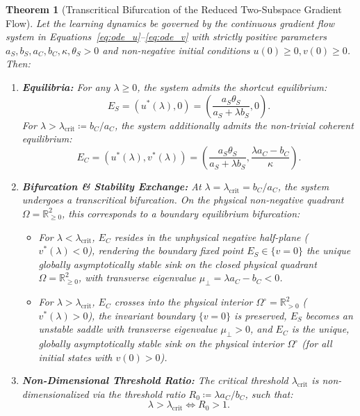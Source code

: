 \documentclass{article}
\theoremstyle{plain}
\newtheorem{theorem}{Theorem}
\theoremstyle{definition}
\begin{document}
\begin{theorem}[Transcritical Bifurcation of the Reduced Two-Subspace Gradient Flow]
\label{thm:transcritical_bifurcation}
Let the learning dynamics be governed by the continuous gradient flow system in Equations~\eqref{eq:ode_u}--\eqref{eq:ode_v} with strictly positive parameters $a_S, b_S, a_C, b_C, \kappa, \theta_S > 0$ and non-negative initial conditions $u(0) \ge 0, v(0) \ge 0$. Then:
\begin{enumerate}[label=(\roman*),leftmargin=*]
    \item \textbf{Equilibria:} For any $\lambda \ge 0$, the system admits the shortcut equilibrium:
    \begin{equation}
        E_S = \left( u^*(\lambda), 0 \right) = \left( \frac{a_S \theta_S}{a_S + \lambda b_S}, 0 \right).
        \label{eq:equilibrium_ES}
    \end{equation}
    For $\lambda > \lambda_{\text{crit}} \coloneqq b_C / a_C$, the system additionally admits the non-trivial coherent equilibrium:
    \begin{equation}
        E_C = \left( u^*(\lambda), v^*(\lambda) \right) = \left( \frac{a_S \theta_S}{a_S + \lambda b_S}, \frac{\lambda a_C - b_C}{\kappa} \right).
        \label{eq:equilibrium_EC}
    \end{equation}
    \item \textbf{Bifurcation \& Stability Exchange:} At $\lambda = \lambda_{\text{crit}} = b_C / a_C$, the system undergoes a transcritical bifurcation. On the physical non-negative quadrant $\Omega = \mathbb{R}_{\ge 0}^2$, this corresponds to a boundary equilibrium bifurcation:
    \begin{itemize}[noitemsep]
        \item For $\lambda < \lambda_{\text{crit}}$, $E_C$ resides in the unphysical negative half-plane ($v^*(\lambda) < 0$), rendering the boundary fixed point $E_S \in \{v=0\}$ the unique globally asymptotically stable sink on the closed physical quadrant $\Omega = \mathbb{R}_{\ge 0}^2$, with transverse eigenvalue $\mu_{\perp} = \lambda a_C - b_C < 0$.
        \item For $\lambda > \lambda_{\text{crit}}$, $E_C$ crosses into the physical interior $\Omega^\circ = \mathbb{R}_{> 0}^2$ ($v^*(\lambda) > 0$), the invariant boundary $\{v=0\}$ is preserved, $E_S$ becomes an unstable saddle with transverse eigenvalue $\mu_{\perp} > 0$, and $E_C$ is the unique, globally asymptotically stable sink on the physical interior $\Omega^\circ$ (for all initial states with $v(0) > 0$).
    \end{itemize}
    \item \textbf{Non-Dimensional Threshold Ratio:} The critical threshold $\lambda_{\text{crit}}$ is non-dimensionalized via the threshold ratio $R_0 \coloneqq \lambda a_C / b_C$, such that:
    \begin{equation}
        \lambda > \lambda_{\text{crit}} \iff R_0 > 1.
    \end{equation}
    \end{enumerate}
\end{theorem}
\end{document}
